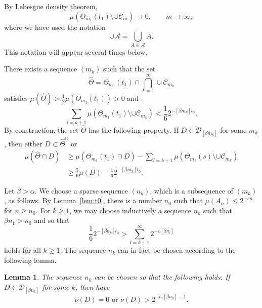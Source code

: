 \documentclass[11pt]{article}
\newtheorem{lemm}[theo]{Lemma}
\theoremstyle{definition}
\numberwithin{equation}{section}
\numberwithin{figure}{section}
\numberwithin{table}{section}
\begin{document}
By Lebesgue density theorem,
\[
\mu (\Theta_{m_1} (t_1) \setminus \cup \mathscr{C}_m) \to 0, \qquad m
\to \infty,
\]
where we have used the notation
\[
\cup \mathscr{A} = \bigcup_{A \in \mathscr{A}} A.
\]
This notation will appear several times below.

There exists a sequence $(m_k)$ such that the set
\[
\hat{\Theta} = \Theta_{m_1} (t_1) \cap \bigcap_{k=1}^\infty \cup \mathscr{C}_{m_k}
\]
satisfies $\mu (\hat{\Theta}) > \frac{1}{2} \mu (\Theta_{m_1} (t_1)) > 0$ and
\[
\sum_{l = k + 1} \mu (\Theta_{m_1} (t_1) \setminus \cup
\mathscr{C}_{m_k}) < \frac{1}{6} 2^{-[\beta m_k] t_0}.
\]
By construction, the set $\hat{\Theta}$ has the following property. If $D \in \mathscr{D}_{[\beta m_k]}$ for some $m_k$, then either $D
\subset \hat{\Theta}^\complement$ or
\begin{align}\label{eq:propertyofDelta}
\mu (\hat{\Theta} \cap D) &\geq \mu (\Theta_{m_1} (t_1) \cap D) -
\sum_{l = k + 1} \mu (\Theta_{m_1} (s) \setminus \cup
\mathscr{C}_{m_k}) \nonumber \\ &\geq \frac{5}{6} \mu (D) -
\frac{1}{6} 2^{-[\beta m_k] t_0}.
\end{align}

Let $\beta > \alpha$. We choose a sparse sequence $(n_k)$, which is a subsequence of $(m_k)$, as follows. By Lemma~\ref{lem:t0}, there is a number $n_0$ such that $\mu (A_n) \leq 2^{- \varepsilon n}$ for $n
\geq n_0$. For $k \geq 1$, we may choose inductively a sequence $n_k$ such that $\beta n_1 > n_0$ and so that
\begin{equation}\label{eq:nk}
\frac{1}{6} 2^{- [\beta n_k] t_0} > \sum_{l = k+1}^\infty 2^{- \varepsilon [\beta n_l]}
\end{equation}
holds for all $k \geq 1$. The sequence $n_k$ can in fact be chosen according to the following lemma.

\begin{lemm}\label{lem:nu}
The sequence $n_k$ can be chosen so that the following holds. If $D \in \mathscr{D}_{[\beta n_k]}$ for some $k$, then have
\[
\nu (D) = 0 \text{ or } \nu (D) > 2^{- t_0 [\beta n_k] - 1}.
\]
\end{lemm}
\end{document}
